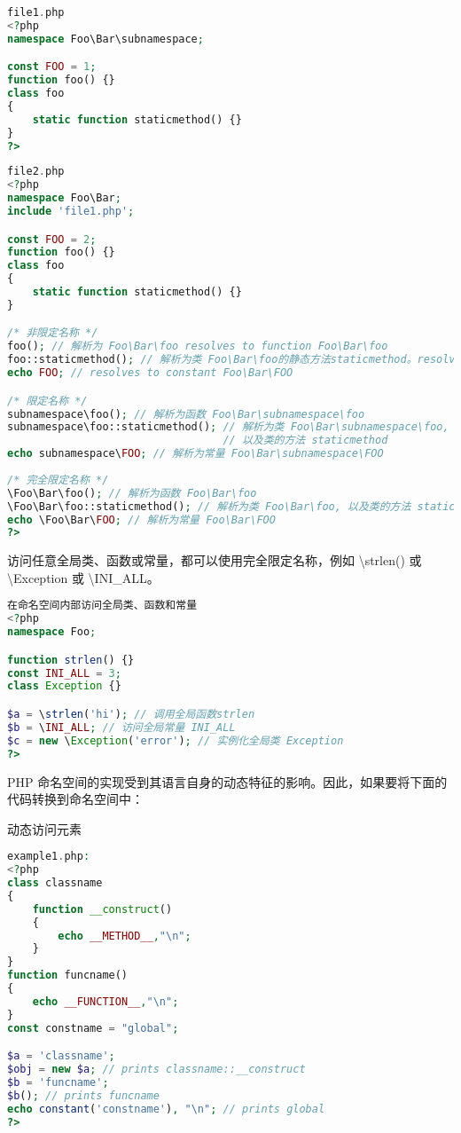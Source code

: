 \begin{lstlisting}[language=PHP]
file1.php
<?php
namespace Foo\Bar\subnamespace;

const FOO = 1;
function foo() {}
class foo
{
    static function staticmethod() {}
}
?>
\end{lstlisting}




\begin{lstlisting}[language=PHP]
file2.php
<?php
namespace Foo\Bar;
include 'file1.php';

const FOO = 2;
function foo() {}
class foo
{
    static function staticmethod() {}
}

/* 非限定名称 */
foo(); // 解析为 Foo\Bar\foo resolves to function Foo\Bar\foo
foo::staticmethod(); // 解析为类 Foo\Bar\foo的静态方法staticmethod。resolves to class Foo\Bar\foo, method staticmethod
echo FOO; // resolves to constant Foo\Bar\FOO

/* 限定名称 */
subnamespace\foo(); // 解析为函数 Foo\Bar\subnamespace\foo
subnamespace\foo::staticmethod(); // 解析为类 Foo\Bar\subnamespace\foo,
                                  // 以及类的方法 staticmethod
echo subnamespace\FOO; // 解析为常量 Foo\Bar\subnamespace\FOO
                                  
/* 完全限定名称 */
\Foo\Bar\foo(); // 解析为函数 Foo\Bar\foo
\Foo\Bar\foo::staticmethod(); // 解析为类 Foo\Bar\foo, 以及类的方法 staticmethod
echo \Foo\Bar\FOO; // 解析为常量 Foo\Bar\FOO
?>
\end{lstlisting}

访问任意全局类、函数或常量，都可以使用完全限定名称，例如 \textbackslash strlen() 或 \textbackslash Exception 或 \textbackslash INI\_ALL。


\begin{lstlisting}[language=PHP]
在命名空间内部访问全局类、函数和常量
<?php
namespace Foo;

function strlen() {}
const INI_ALL = 3;
class Exception {}

$a = \strlen('hi'); // 调用全局函数strlen
$b = \INI_ALL; // 访问全局常量 INI_ALL
$c = new \Exception('error'); // 实例化全局类 Exception
?>
\end{lstlisting}

PHP 命名空间的实现受到其语言自身的动态特征的影响。因此，如果要将下面的代码转换到命名空间中：

\begin{example}
动态访问元素
\begin{lstlisting}[language=PHP]
example1.php:
<?php
class classname
{
    function __construct()
    {
        echo __METHOD__,"\n";
    }
}
function funcname()
{
    echo __FUNCTION__,"\n";
}
const constname = "global";

$a = 'classname';
$obj = new $a; // prints classname::__construct
$b = 'funcname';
$b(); // prints funcname
echo constant('constname'), "\n"; // prints global
?>
\end{lstlisting}
\end{example}

